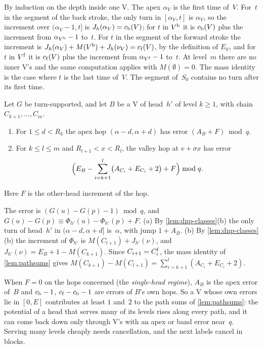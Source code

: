 \begin{informalproof}
By induction on the depth inside one V. The apex $\alpha_V$ is the first time of~$V$. For~$t$ in the segment of the back stroke,
the only turn in $[\alpha_V,t]$ is $\alpha_V$, so the increment over $(\alpha_V-1,t]$ is $J_h(\alpha_V)=c_{\mathrm{b}}(V)$; for $t$
in $V^{\mathrm{b}}$ it is $c_{\mathrm{b}}(V)$ plus the increment from $\alpha_{V^{\mathrm{b}}}-1$ to~$t$. For $t$ in the segment of the forward
stroke the increment is $J_h(\alpha_V)+M(V^{\mathrm{b}})+J_h(\nu_V)=c_{\mathrm{f}}(V)$, by the definition of $E_V$, and for $t$ in
$V^{\mathrm{f}}$ it is $c_{\mathrm{f}}(V)$ plus the increment from $\alpha_{V^{\mathrm{f}}}-1$ to~$t$. At level~$m$ there are no inner V's and
the same computation applies with $M(\emptyset)=0$. The mass identity is the case where $t$ is the last time of~$V$. The
segment of~$S_0$ contains no turn after its first time.
\end{informalproof}

\begin{lemma}\label{lem:band}
\notformalized
Let $G$ be turn-supported, and let $B$ be a V of head~$h'$ of level $k\ge1$, with chain $C_{k+1},\dots,C_m$.
\begin{enumerate}[label=(\alph*)]
\item For $1\le d<R_k$ the apex hop $(\alpha-d,\alpha+d)$ has error $(A_B+F)\bmod q$.
\item For $k\le l\le m$ and $R_{l+1}<x<R_l$, the valley hop at $v+\sigma x$ has error
\[
  \Bigl(E_B-\sum_{i=k+1}^{l}\bigl(A_{C_i}+E_{C_i}+2\bigr)+F\Bigr)\bmod q .
\]
\end{enumerate}
Here $F$ is the other-head increment of the hop.
\end{lemma}

\begin{informalproof}
The error is $(G(u)-G(p)-1)\bmod q$, and $G(u)-G(p)\equiv\Phi_{h'}(u)-\Phi_{h'}(p)+F$. (a) By \cref{lem:dnp-classes}(b) the
only turn of head~$h'$ in $(\alpha-d,\alpha+d]$ is~$\alpha$, with jump $1+A_B$. (b) By \cref{lem:dnp-classes}(b) the
increment of $\Phi_{h'}$ is $M(C_{l+1})+J_{h'}(\nu)$, and $J_{h'}(\nu)=E_B+1-M(C_{k+1})$. Since $C_{i+1}=C_i^{\mathrm{f}}$, the mass
identity of \cref{lem:pathsums} gives $M(C_{k+1})-M(C_{l+1})=\sum_{i=k+1}^l(A_{C_i}+E_{C_i}+2)$.
\end{informalproof}

When $F=0$ on the hops concerned (the \emph{single-head regime}), $A_B$ is the apex error of~$B$ and $c_{\mathrm{b}}-1$,
$c_{\mathrm{f}}-c_{\mathrm{b}}-1$ are errors of $B$'s own hops. So a V whose own errors lie in $[0,E]$ contributes at least $1$ and~$2$ to
the path sums of \cref{lem:pathsums}: the potential of a head that serves many of its levels rises along every path, and it
can come back down only through V's with an apex or band error near~$q$. Serving many levels cheaply needs cancellation,
and the next labels cancel in blocks.

